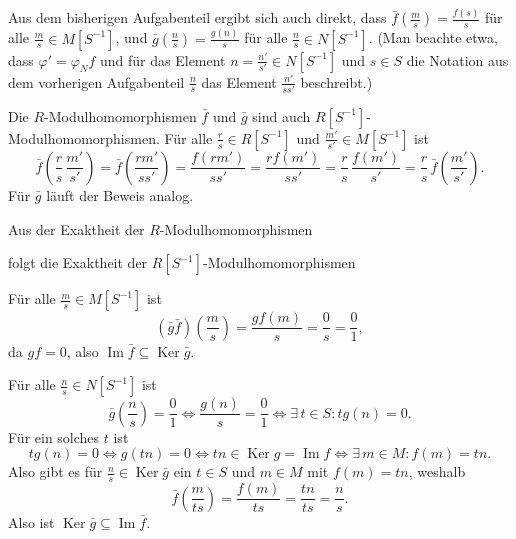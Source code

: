 \documentclass[a4paper,10pt]{article}
\theoremstyle{definition}
\newcommand{\Img}{\operatorname{Im}}
\newcommand{\Ker}{\operatorname{Ker}}
\begin{document}
Aus dem bisherigen Aufgabenteil ergibt sich auch direkt, dass $\bar{f}\left(\frac{m}{s}\right) = \frac{f(s)}{s}$ für alle $\frac{m}{s} \in M[S^{-1}]$, und $\bar{g}\left(\frac{n}{s}\right) = \frac{g(n)}{s}$ für alle $\frac{n}{s} \in N[S^{-1}]$. (Man beachte etwa, dass $\varphi' = \varphi_N f$ und für das Element $n = \frac{n'}{s'} \in N[S^{-1}]$ und $s \in S$ die Notation aus dem vorherigen Aufgabenteil $\frac{n}{s}$ das Element $\frac{n'}{ss'}$ beschreibt.)

Die $R$-Modulhomomorphismen $\bar{f}$ und $\bar{g}$ sind auch $R[S^{-1}]$-Modulhomomorphismen. Für alle $\frac{r}{s} \in R[S^{-1}]$ und $\frac{m'}{s'} \in M[S^{-1}]$ ist
\[
 \bar{f}\left( \frac{r}{s} \, \frac{m'}{s'} \right)
 = \bar{f}\left( \frac{rm'}{ss'} \right)
 = \frac{f(rm')}{ss'}
 = \frac{r f(m')}{ss'}
 = \frac{r}{s} \, \frac{f(m')}{s'}
 = \frac{r}{s} \, \bar{f}\left( \frac{m'}{s'} \right).
\]
Für $\bar{g}$ läuft der Beweis analog.

Aus der Exaktheit der $R$-Modulhomomorphismen
\begin{center}
\end{center}
folgt die Exaktheit der $R[S^{-1}]$-Modulhomomorphismen
\begin{center}
\end{center}

Für alle $\frac{m}{s} \in M[S^{-1}]$ ist
\[
 (\bar{g} \bar{f})\left( \frac{m}{s} \right)
 = \frac{gf(m)}{s}
 = \frac{0}{s}
 = \frac{0}{1},
\]
da $gf = 0$, also $\Img \bar{f} \subseteq \Ker \bar{g}$.

Für alle $\frac{n}{s} \in N[S^{-1}]$ ist
\[
 \bar{g}\left(\frac{n}{s}\right) = \frac{0}{1}
 \Leftrightarrow \frac{g(n)}{s} = \frac{0}{1}
 \Leftrightarrow \exists\, t \in S : tg(n) = 0.
\]
Für ein solches $t$ ist
\[
 tg(n) = 0 
 \Leftrightarrow g(tn) = 0
 \Leftrightarrow tn \in \Ker g = \Img f
 \Leftrightarrow \exists\, m \in M : f(m) = tn.
\]
Also gibt es für $\frac{n}{s} \in \Ker \bar{g}$ ein $t \in S$ und $m \in M$ mit $f(m) = tn$, weshalb
\[
 \bar{f}\left( \frac{m}{ts} \right)
 = \frac{f(m)}{ts}
 = \frac{tn}{ts}
 = \frac{n}{s}.
\]
Also ist $\Ker \bar{g} \subseteq \Img \bar{f}$.
\end{document}
